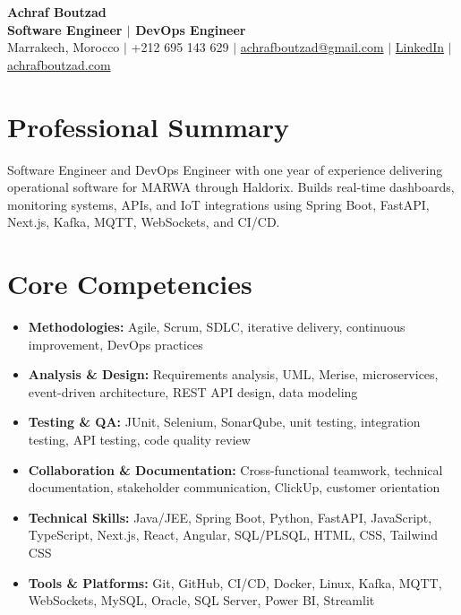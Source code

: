 \documentclass[11pt]{article}
\begin{document}
{\LARGE\textbf{Achraf Boutzad}}\\[-1pt]
{\large\textbf{Software Engineer $|$ DevOps Engineer}}\\[-1pt]
Marrakech, Morocco $|$ +212 695 143 629 $|$ \href{mailto:achrafboutzad@gmail.com}{achrafboutzad@gmail.com} $|$ \href{https://www.linkedin.com/in/achraf-boutzad/}{LinkedIn} $|$ \href{https://achrafboutzad.com}{achrafboutzad.com}

\section{Professional Summary}
Software Engineer and DevOps Engineer with one year of experience delivering operational software for MARWA through Haldorix. Builds real-time dashboards, monitoring systems, APIs, and IoT integrations using Spring Boot, FastAPI, Next.js, Kafka, MQTT, WebSockets, and CI/CD.

\section{Core Competencies}
\begin{itemize}
  \item \textbf{Methodologies:} Agile, Scrum, SDLC, iterative delivery, continuous improvement, DevOps practices
  \item \textbf{Analysis \& Design:} Requirements analysis, UML, Merise, microservices, event-driven architecture, REST API design, data modeling
  \item \textbf{Testing \& QA:} JUnit, Selenium, SonarQube, unit testing, integration testing, API testing, code quality review
  \item \textbf{Collaboration \& Documentation:} Cross-functional teamwork, technical documentation, stakeholder communication, ClickUp, customer orientation
  \item \textbf{Technical Skills:} Java/JEE, Spring Boot, Python, FastAPI, JavaScript, TypeScript, Next.js, React, Angular, SQL/PLSQL, HTML, CSS, Tailwind CSS
  \item \textbf{Tools \& Platforms:} Git, GitHub, CI/CD, Docker, Linux, Kafka, MQTT, WebSockets, MySQL, Oracle, SQL Server, Power BI, Streamlit
\end{itemize}
\end{document}
